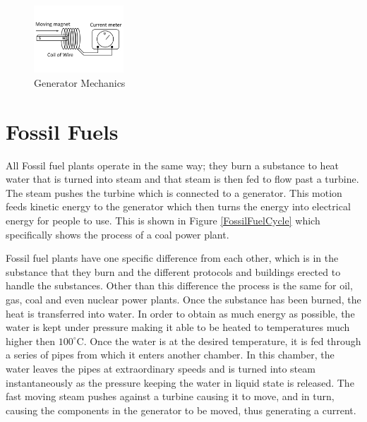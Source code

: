 \documentclass[msc,oneside]{ubcthesis}%
\begin{document}
  \begin{figure}[hbt]{\label{Induction} }
  \begin{center}
    \includegraphics[width=0.3\textwidth]{Induction}
    \caption[Generator Mechanics]{Generator Mechanics \cite{Current}}  
  \end{center}
\end{figure}

\newpage
  \section{Fossil Fuels}

  All Fossil fuel plants operate in the same way; they burn a substance to heat water that is turned into 
  steam and that steam is then fed to flow past a turbine. The steam pushes the turbine which is connected to a generator. This motion feeds kinetic energy to the generator which then turns the energy into electrical energy for people to use. This is shown in Figure \ref{FossilFuelCycle} which specifically shows the process of a coal power plant. 

Fossil fuel plants have one specific difference from each other, which is in the substance that they burn and the different protocols and buildings erected to handle the substances. Other than this difference the process is the same for oil, gas, coal and even nuclear power plants. Once the substance has been burned, the heat is transferred into water. In order to obtain as much energy as possible, the water is kept under pressure making it able to be heated to temperatures much higher then $100^\circ$C. Once the water is at the desired temperature, it is fed through a series of pipes from which it enters another chamber. In this chamber, the water leaves the pipes at extraordinary speeds and is turned into steam instantaneously as the pressure keeping the water in liquid state is released. The fast moving steam pushes against a turbine causing it to move, and in turn, causing the components in the generator to be moved, thus generating a current. 
\end{document}
